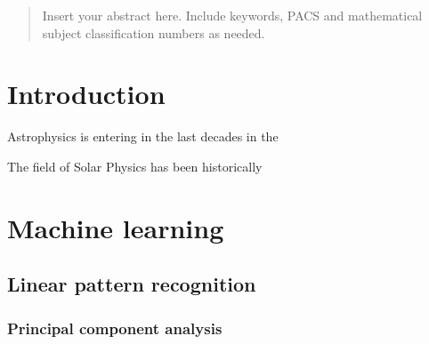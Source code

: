\date{Received: date / Accepted: date}

\maketitle


\begin{abstract}
Insert your abstract here. Include keywords, PACS and mathematical
subject classification numbers as needed.
\end{abstract}

\section{Introduction}
\label{intro}
Astrophysics is entering in the last decades in the 


The field of Solar Physics has been historically 


\section{Machine learning}
\label{sec:1}

\subsection{Linear pattern recognition}
\subsubsection{Principal component analysis}

